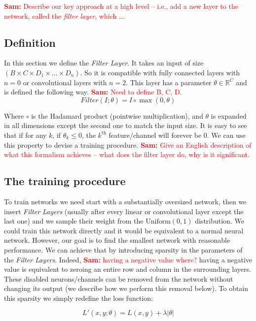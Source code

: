 \documentclass[sigconf]{acmart}
\newcommand{\srm}[1]{\textcolor{red}{{\bf Sam:} #1}}
\begin{document}
\srm{Describe our key approach at a high level -- i.e., add a new layer to the network, called the {\it filter layer}, which ... }
\subsection{Definition}

In this section we define the \textit{Filter Layer}. It takes an input of size $\left(B \times C \times D_1 \times \dots \times D_n\right)$. So it is compatible with fully connected layers with $n=0$ or convolutional layers with $n=2$. This layer has a parameter $\theta \in \mathbb{R}^C$ and is defined the following way. \srm{Need to define B, C, D}.  
\begin{equation}
  Filter(I;\theta) = I \circ \max(0, \theta)
\end{equation}

Where $\circ$ is the Hadamard product (pointwise multiplication), and $\theta$ is expanded in all dimensions except the second one to match the input size. It is easy to see that if for any $k$, if $\theta_k \leq 0$, the $k^{\text{th}}$ feature/channel will forever be $0$. We can use this property to devise a training procedure.  \srm{Give an English description of what this formalism achieves -- what does the filter layer do, why is it significant.}

\subsection{The training procedure}

To train networks we need start with a substantially oversized network, then we insert \textit{Filter Layers}  (usually after every linear or convolutional layer except the last one) and we sample their weight from the $\text{Uniform}(0, 1)$ distribution. We could train this network directly and it would be equivalent to a normal neural network. However, our goal is to find the smallest network with reasonable performance. We can achieve that by introducing sparsity in the parameters of the \textit{Filter Layers}. Indeed, \srm{having a negative value where?} having a negative value is equivalent to zeroing an entire row and column in the surrounding layers. These disabled neurons/channels can be removed from the network without changing its output (we describe how we perform this removal below). To obtain this sparsity we simply redefine the loss function:  

\begin{equation}
  L'(x,y;\theta) = L(x, y) + \lambda|\theta|
\end{equation}
\end{document}
